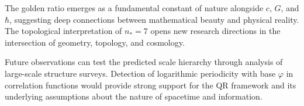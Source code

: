 The golden ratio emerges as a fundamental constant of nature alongside $c$, $G$, and $\hbar$, suggesting deep connections between mathematical beauty and physical reality. The topological interpretation of $n_* = 7$ opens new research directions in the intersection of geometry, topology, and cosmology.

Future observations can test the predicted scale hierarchy through analysis of large-scale structure surveys. Detection of logarithmic periodicity with base $\varphi$ in correlation functions would provide strong support for the QR framework and its underlying assumptions about the nature of spacetime and information.